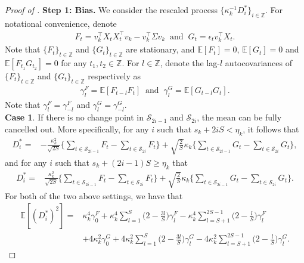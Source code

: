 \documentclass[11pt]{article}
\theoremstyle{plain}
\theoremstyle{definition}
\begin{document}
\begin{proof}[Proof of ]

{\bf Step 1: Bias.}
We consider the rescaled process $\{\kappa_k^{-1}D_i^*\}_{i \in \mathbb Z}$.
For notational convenience, denote
\begin{align*}
    F_t = v_k^{\top}X_tX_t^{\top}v_k - v_k^{\top}\Sigma v_k \;\; \text{and} \;\; G_t = \epsilon_tv_k^{\top}X_t.
\end{align*}
Note that $\{F_t\}_{t \in \mathbb{Z}}$ and $\{G_t\}_{t \in \mathbb{Z}}$ are stationary, and $\mathbb{E}[F_t] = 0$, $\mathbb{E}[G_t] = 0$ and $\mathbb{E}[F_{t_1}G_{t_2}] = 0$ for any $t_1, t_2 \in \mathbb{Z}$. For $l \in \mathbb{Z}$, denote the lag-$l$ autocovariances of $\{F_t\}_{t \in \mathbb{Z}}$ and $\{G_t\}_{t \in \mathbb{Z}}$ respectively as
\begin{align*}
    \gamma_{l}^F = \mathbb{E}[F_{t-l}F_t] \;\; \text{and} \;\; \gamma_{l}^G = \mathbb{E}[G_{t-l}G_t].
\end{align*}
Note that $\gamma_{l}^F = \gamma_{-l}^F$ and $\gamma_{l}^G = \gamma_{-l}^G$.
\
\\
\textbf{Case 1}.
If there is no change point in $\mathcal{S}_{2i-1}$ and $\mathcal{S}_{2i}$, the mean can be fully cancelled out. More specifically, for any $i$ such that $s_k + 2iS < \eta_k$, it follows that
\begin{align*}
   D_i^*
   =& -\frac{\kappa_k^2}{\sqrt{2S}}\bigg\{\sum_{t \in \mathcal{S}_{2i-1}}F_t - \sum_{t \in \mathcal{S}_{2i}}F_t\bigg\}+\sqrt{\frac{2}{S}}\kappa_k\bigg\{\sum_{t \in \mathcal{S}_{2i-1}}G_t - \sum_{t \in \mathcal{S}_{2i}}G_t\bigg\},
\end{align*}
and for any $i$ such that $s_k + (2i-1)S \geq \eta_k$ that
\begin{align*}
   D_i^* =& \frac{\kappa_k^2}{\sqrt{2S}}\bigg\{\sum_{t \in \mathcal{S}_{2i-1}}F_t - \sum_{t \in \mathcal{S}_{2i}}F_t\bigg\}+\sqrt{\frac{2}{S}}\kappa_k\bigg\{\sum_{t \in \mathcal{S}_{2i-1}}G_t - \sum_{t \in \mathcal{S}_{2i}}G_t\bigg\}.
\end{align*}
For both of the two above settings, we have that
\begin{align*}
    \mathbb{E}[(D_i^*)^2] =& \kappa_k^4\gamma^F_0 + \kappa_k^4\sum_{l = 1}^{S}\Big(2-\frac{3l}{S}\Big)\gamma_l^F - \kappa_k^4\sum_{l = S+1}^{2S-1}\Big(2-\frac{l}{S}\Big)\gamma_l^F\\
    &+ 4\kappa_k^2\gamma^G_0 + 4\kappa_k^2\sum_{l = 1}^{S}\Big(2-\frac{3l}{S}\Big)\gamma_l^G - 4\kappa_k^2\sum_{l = S+1}^{2S-1}\Big(2-\frac{l}{S}\Big)\gamma_l^G.

\end{align*}
\end{proof}
\end{document}
